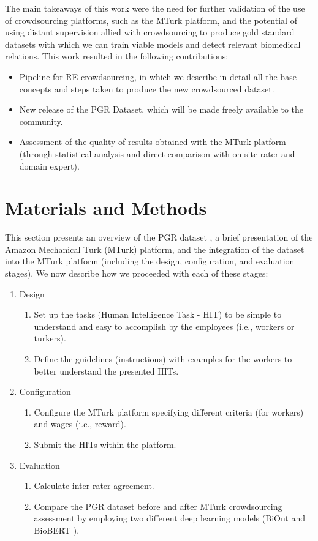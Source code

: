 The main takeaways of this work were the need for further validation of the use of crowdsourcing platforms, such as the MTurk platform, and the potential of using distant supervision allied with crowdsourcing to produce gold standard datasets with which we can train viable models and detect relevant biomedical relations. This work resulted in the following contributions:

\begin{itemize}
    \item Pipeline for RE crowdsourcing, in which we describe in detail all the base concepts and steps taken to produce the new crowdsourced dataset.
    \item New release of the PGR Dataset, which will be made freely available to the community.
    \item Assessment of the quality of results obtained with the MTurk platform (through statistical analysis and direct comparison with on-site rater and domain expert).
\end{itemize}

\section{Materials and Methods}

This section presents an overview of the PGR dataset \citep{sousa2019silver}, a brief presentation of the Amazon Mechanical Turk (MTurk) platform, and the integration of the dataset into the MTurk platform (including the design, configuration, and evaluation stages). We now describe how we proceeded with each of these stages: 

\begin{enumerate}
    \item Design
    \begin{enumerate}
        \item Set up the tasks (Human Intelligence Task - HIT) to be simple to understand and easy to accomplish by the employees (i.e., workers or turkers).
        \item Define the guidelines (instructions) with examples for the workers to better understand the presented HITs. 
    \end{enumerate}
    \item Configuration
    \begin{enumerate}
        \item Configure the MTurk platform specifying different criteria (for workers) and wages (i.e., reward).
        \item Submit the HITs within the platform.
    \end{enumerate}
    \item Evaluation
    \begin{enumerate}
        \item Calculate inter-rater agreement.
        \item Compare  the PGR dataset before and after MTurk crowdsourcing assessment by employing  two different deep learning models (BiOnt \citep{sousa2020biont} and BioBERT \citep{lee2020biobert}).
    \end{enumerate}
\end{enumerate}

